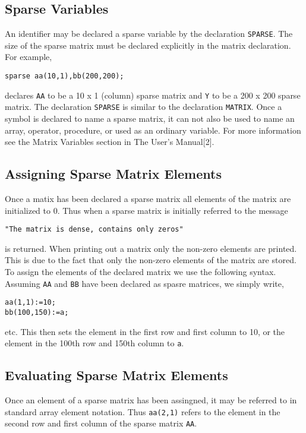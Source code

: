 \subsection{Sparse Variables}
An identifier may be declared a sparse variable by the declaration
{\tt SPARSE}.
The size of the sparse matrix must be declared explicitly in the matrix
declaration. For example,
\begin{verbatim}
sparse aa(10,1),bb(200,200);
\end{verbatim}
declares {\tt AA} to be a 10 x 1 (column) sparse matrix and {\tt Y} to 
be a 200 x 200 sparse matrix.
The declaration {\tt SPARSE} is similar to the declaration {\tt MATRIX}.
Once a symbol is declared to name a sparse matrix, it can not also be 
used to name an array, operator, procedure, or used as an ordinary 
variable. For more information see the Matrix Variables section in The
\REDUCE {} User's Manual[2].

\subsection{Assigning Sparse Matrix Elements}
Once a matix has been declared a sparse matrix all elements of the 
matrix are initialized to 0. Thus when a sparse matrix is initially 
referred to the message
\begin{verbatim}
"The matrix is dense, contains only zeros"
\end{verbatim}
is returned. When printing out a matrix only the non-zero elements are 
printed. This is due to the fact that only the non-zero elements of the 
matrix are stored. 
To assign the elements of the declared matrix we use the following 
syntax. Assuming {\tt AA} and {\tt BB} have been declared as spasre 
matrices, we simply write,
\begin{verbatim}
aa(1,1):=10;
bb(100,150):=a;
\end{verbatim}
etc. This then sets the element in the first row and first column to 10,
or the element in the 100th row and 150th column to {\tt a}.

\subsection{Evaluating Sparse Matrix Elements}
Once an element of a sparse matrix has been assingned, it may be referred
to in standard array element notation. Thus {\tt aa(2,1)} refers to the 
element in the second row and first column of the sparse matrix {\tt AA}.

